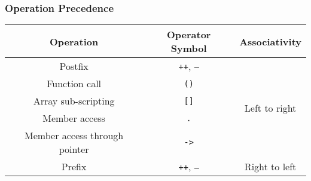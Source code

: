 \documentclass{article}
\begin{document}
\subsubsection{Operation Precedence}
\begin{table}[H]
    \centering
    \begin{tabular}{c c c}
        \toprule
        \textbf{Operation}            & \textbf{Operator Symbol}                                                                                                                                                                                                  & \textbf{Associativity}         \\
        \midrule
        Postfix                       & \texttt{++}, \texttt{--}                                                                                                                                                                                    & \multirow{5}{*}{Left to right} \\
        Function call                 & \texttt{()}                                                                                                                                                                                                        &                                \\
        Array sub-scripting           & \texttt{[]}                                                                                                                                                                                                        &                                \\
        Member access                 & \texttt{.}                                                                                                                                                                                                         &                                \\
        Member access through pointer & \texttt{->}                                                                                                                                                                                                        &                                \\
        \midrule
        Prefix                        & \texttt{++}, \texttt{--}                                                                                                                                                                                    & \multirow{7}{*}{Right to left} \\

\end{tabular}
\end{table}
\end{document}
